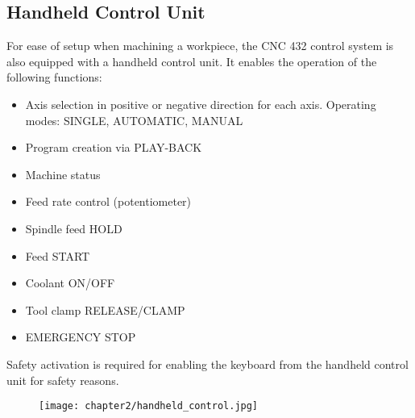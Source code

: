 \subsection{Handheld Control Unit}

For ease of setup when machining a workpiece, the CNC 432 control system is also equipped with a handheld control unit. It enables the operation of the following functions:

\begin{itemize}[itemsep=1pt,parsep=0pt]
    \item Axis selection in positive or negative direction for each axis. Operating modes: SINGLE, AUTOMATIC, MANUAL
    \item Program creation via PLAY-BACK
    \item Machine status
    \item Feed rate control (potentiometer)
    \item Spindle feed HOLD
    \item Feed START
    \item Coolant ON/OFF
    \item Tool clamp RELEASE/CLAMP
    \item EMERGENCY STOP
\end{itemize}

Safety activation is required for enabling the keyboard from the handheld control unit for safety reasons.

\vspace{0.3cm}


\vspace{0.3cm}


\vspace{-0.6cm}

\begin{center}
\end{center}

\vspace{-0.5cm}

\begin{figure}[h]
    \centering
    \texttt{[image: chapter2/handheld\_control.jpg]}
\end{figure}

